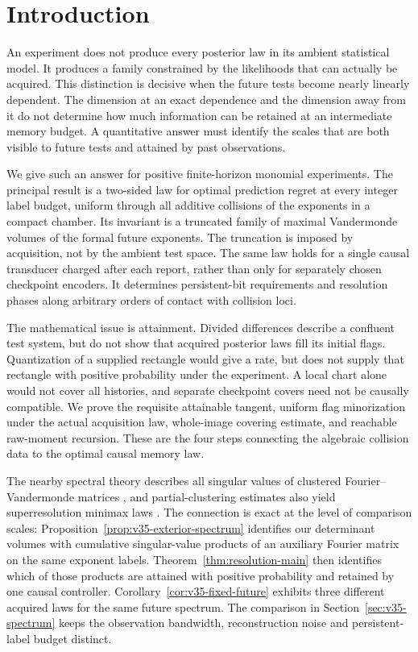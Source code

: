 \section{Introduction}
\label{sec:introduction}
An experiment does not produce every posterior law in its ambient
statistical model. It produces a family constrained by the likelihoods
that can actually be acquired. This distinction is decisive when the
future tests become nearly linearly dependent. The dimension at an
exact dependence and the dimension away from it do not determine how
much information can be retained at an intermediate memory budget.
A quantitative answer must identify the scales that are both visible
to future tests and attained by past observations.

We give such an answer for positive finite-horizon monomial experiments.
The principal result is a two-sided law for optimal prediction regret
at every integer label budget, uniform through all additive collisions
of the exponents in a compact chamber. Its invariant is a truncated
family of maximal Vandermonde volumes of the formal future exponents.
The truncation is imposed by acquisition, not by the ambient test space.
The same law holds for a single causal transducer charged after each
report, rather than only for separately chosen checkpoint encoders.
It determines persistent-bit requirements and resolution phases along
arbitrary orders of contact with collision loci.

The mathematical issue is attainment. Divided differences describe a
confluent test system, but do not show that acquired posterior laws
fill its initial flags. Quantization of a supplied rectangle would give
a rate, but does not supply that rectangle with positive probability
under the experiment. A local chart alone would not cover all histories,
and separate checkpoint covers need not be causally compatible. We prove
the requisite attainable tangent, uniform flag minorization under the
actual acquisition law, whole-image covering estimate, and reachable
raw-moment recursion. These are the four steps connecting the algebraic
collision data to the optimal causal memory law.

The nearby spectral theory describes all singular values of clustered
Fourier--Vandermonde matrices \cite{BDGGY2021}, and partial-clustering
estimates also yield superresolution minimax laws \cite{BDGY2020}.
The connection is exact at the level of comparison scales:
Proposition~\ref{prop:v35-exterior-spectrum} identifies our determinant
volumes with cumulative singular-value products of an auxiliary Fourier
matrix on the same exponent labels. Theorem~\ref{thm:resolution-main}
then identifies which of those products are attained with positive
probability and retained by one causal controller. Corollary~\ref{cor:v35-fixed-future}
exhibits three different acquired laws for the same future spectrum.
The comparison in Section~\ref{sec:v35-spectrum} keeps the observation
bandwidth, reconstruction noise and persistent-label budget distinct.

